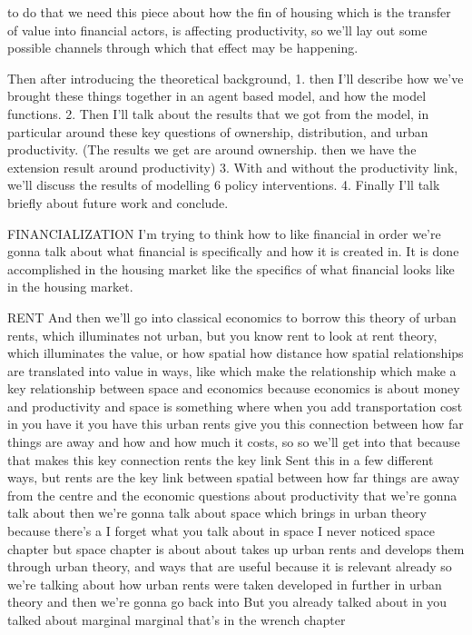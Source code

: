 to do that we need this piece about how the fin of housing which is the transfer of value into financial actors, is affecting productivity, so we'll lay out some possible channels through which that effect may be happening.

Then  after introducing the theoretical background, 
1. then I'll describe how we've brought these things together in an agent based model, and how the model functions. 
2. Then I'll talk about the results that we got from the model, in particular around these key questions of ownership, distribution, and urban productivity.  (The results we get  are around ownership. then we have the extension result around productivity) 
3. With and without the productivity link, we'll discuss the results of modelling 6 policy interventions. 
4. Finally I'll talk briefly about future work and conclude. 





FINANCIALIZATION
I’m trying to think how to like financial in order we’re gonna talk about what financial is specifically and how it is created in. It is done accomplished in the housing market like the specifics of what financial looks like in the housing market.

RENT
And then we’ll go into classical economics to borrow this theory of urban rents, which illuminates not urban, but you know rent to look at rent theory, which illuminates the value, or how spatial how distance how spatial relationships are translated into value in ways, like which make the relationship which make a key relationship between space and economics because economics is about money and productivity and space is something where when you add transportation cost in you have it you have this urban rents give you this connection between how far things are away and how and how much it costs, so so we’ll get into that because that makes this key connection rents the key link Sent this in a few different ways, but rents are the key link between spatial between how far things are away from the centre and the economic questions about productivity that we’re gonna talk about then we’re gonna talk about space which brings in urban theory because there’s a I forget what you talk about in space I never noticed space chapter but space chapter is about about takes up urban rents and develops them through urban theory, and ways that are useful because it is relevant already so we’re talking about how urban rents were taken developed in further in urban theory and then we’re gonna go back into But you already talked about in you talked about marginal marginal that’s in the wrench chapter

